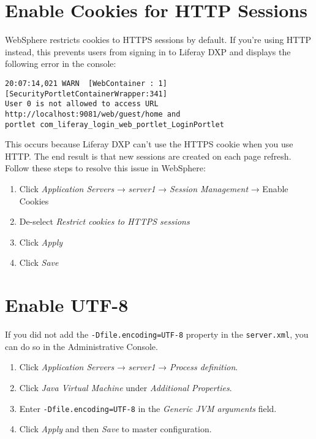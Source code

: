 \section{Enable Cookies for HTTP
Sessions}\label{enable-cookies-for-http-sessions}

WebSphere restricts cookies to HTTPS sessions by default. If you're
using HTTP instead, this prevents users from signing in to Liferay DXP
and displays the following error in the console:

\begin{verbatim}
20:07:14,021 WARN  [WebContainer : 1][SecurityPortletContainerWrapper:341]
User 0 is not allowed to access URL http://localhost:9081/web/guest/home and
portlet com_liferay_login_web_portlet_LoginPortlet
\end{verbatim}

This occurs because Liferay DXP can't use the HTTPS cookie when you use
HTTP. The end result is that new sessions are created on each page
refresh. Follow these steps to resolve this issue in WebSphere:

\begin{enumerate}
\def\labelenumi{\arabic{enumi}.}
\item
  Click \emph{Application Servers} → \emph{server1} → \emph{Session
  Management} → Enable Cookies
\item
  De-select \emph{Restrict cookies to HTTPS sessions}
\item
  Click \emph{Apply}
\item
  Click \emph{Save}
\end{enumerate}

\section{Enable UTF-8}\label{enable-utf-8}

If you did not add the \texttt{-Dfile.encoding=UTF-8} property in the
\texttt{server.xml}, you can do so in the Administrative Console.

\begin{enumerate}
\def\labelenumi{\arabic{enumi}.}
\item
  Click \emph{Application Servers} → \emph{server1} → \emph{Process
  definition}.
\item
  Click \emph{Java Virtual Machine} under \emph{Additional Properties}.
\item
  Enter \texttt{-Dfile.encoding=UTF-8} in the \emph{Generic JVM
  arguments} field.
\item
  Click \emph{Apply} and then \emph{Save} to master configuration.
\end{enumerate}

